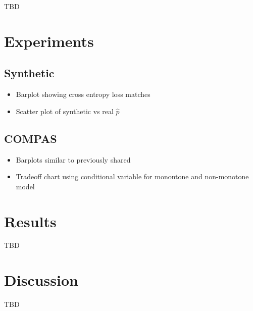     TBD

\section{Experiments}\label{sec:softmono_experiments}

    \subsection{Synthetic}
        \begin{itemize}
            \item Barplot showing cross entropy loss matches
            \item Scatter plot of synthetic vs real $\hat{p}$
        \end{itemize}
        
    \subsection{COMPAS}
    
        \begin{itemize}
            \item Barplots similar to previously shared
            \item Tradeoff chart using conditional variable for monontone and non-monotone model
        \end{itemize}
\section{Results}\label{sec:softmono_results}
    
    TBD

\section{Discussion}\label{sec:softmono_discussion}
    
    TBD